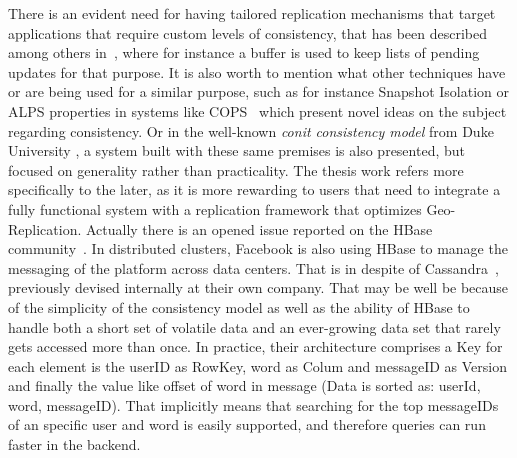There is an evident need for having tailored replication mechanisms that target applications that require custom levels of consistency, that has been described among others in~\cite{Kraska:2009}, where for instance a buffer is used to keep lists of pending updates for that purpose. It is also worth to mention what other techniques have or are being used for a similar purpose, such as for instance Snapshot Isolation or ALPS properties in systems like COPS~\cite{Lloyd:2011} which present novel ideas on the subject regarding consistency. Or in the well-known \emph{conit consistency model} from Duke University \cite{Duke:2001}, a system built with these same premises is also presented, but focused on generality rather than practicality. The thesis work refers more specifically to the later, as it is more rewarding to users that need to integrate a fully functional system with a replication framework that optimizes Geo-Replication. Actually there is an opened issue reported on the HBase community~\cite{JIRA-1}. In distributed clusters, Facebook is also using HBase to manage the messaging of the platform across data centers. That is in despite of Cassandra~\cite{FacebookHBase}, previously devised internally at their own company. That may be well be because of the simplicity of the consistency model as well as the ability of HBase to handle both a short set of volatile data and an ever-growing data set that rarely gets accessed more than once. In practice, their architecture comprises a Key for each element is the userID as RowKey, word as Colum and messageID as Version and finally the value like offset of word in message (Data is sorted as: userId, word, messageID). That implicitly means that searching for the top messageIDs of an specific user and word is easily supported, and therefore queries can run faster in the backend.



